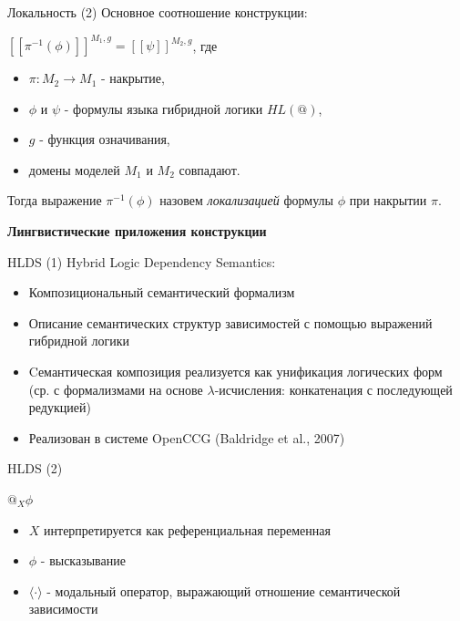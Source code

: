 \documentclass{beamer}
\begin{document}
\begin{frame}{Локальность (2)}
Основное соотношение конструкции:\\
\bigskip
\begin{center}
$[ \! [ \pi^{-1}(\phi) ] \! ]^{M_1, g} = [ \! [ \psi ] \! ]^{M_2, g}$, где
\end{center}
\bigskip
\begin{itemize}
	\item $\pi : M_2 \to M_1$ - накрытие,
	\item $\phi$ и $\psi$ - формулы языка гибридной логики $HL(@)$,
	\item $g$ - функция означивания,
	\item домены моделей $M_1$ и $M_2$ совпадают.
\end{itemize}
\bigskip
Тогда выражение $\pi^{-1}(\phi)$ назовем \textit{локализацией} формулы $\phi$ при накрытии $\pi$.
\end{frame}


\begin{frame}{}
\begin{center}
	\textbf{Лингвистические приложения конструкции}
\end{center}
\end{frame}

\begin{frame}{HLDS (1)}
Hybrid Logic Dependency Semantics:\\
\bigskip
\begin{itemize}
	\item Композициональный семантический формализм 
	\item Описание семантических структур зависимостей с помощью выражений гибридной логики
	\item Cемантическая композиция реализуется как унификация логических форм (ср. с формализмами на основе $\lambda$-исчисления: конкатенация с последующей редукцией)
	\item Реализован в системе OpenCCG (Baldridge et al., 2007)
\end{itemize}
\end{frame}

\begin{frame}{HLDS (2)}
\begin{center}
$@_X\phi$
\end{center}
\bigskip
\begin{itemize}
	\item $X$ интерпретируется как референциальная переменная
	\item $\phi$ - высказывание
	\item $\langle \cdot \rangle$ - модальный оператор, выражающий отношение семантической зависимости
\end{itemize}	
\end{frame}
\end{document}
